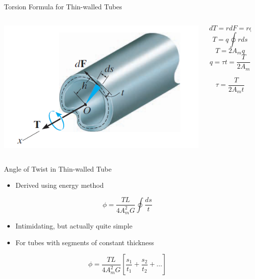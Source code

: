 \documentclass[10pt, svgnames]{beamer}
\begin{document}
\begin{frame}[label={sec:org9d59bc4}]{Torsion Formula for Thin-walled Tubes}
\begin{columns}
\begin{column}{0.6\columnwidth}
\begin{center}
\begin{center}
\includegraphics[width=.9\linewidth]{./pictures/thin-walled-torsion-formula.png}
\end{center}
\end{center}
\end{column}

\begin{column}{0.4\columnwidth}
\[dT = rdF = rqds\] \[T = q \oint rds\] \[T = 2 A_m q\]
\[q = \tau t = \frac{T}{2A_m}\]

\[\tau = \frac{T}{2A_m t}\]
\end{column}
\end{columns}
\end{frame}

\begin{frame}[label={sec:org157de5b}]{Angle of Twist in Thin-walled Tube}
\begin{itemize}
\item Derived using energy method
\end{itemize}

\[\phi = \frac{TL}{4A_m^2 G} \oint \frac{ds}{t}\]

\begin{itemize}
\item Intimidating, but actually quite simple

\item For tubes with segments of constant thickness
\end{itemize}

\[\phi = \frac{TL}{4A_m^2 G} \left[ \frac{s_1}{t_1} + \frac{s_2}{t_2} + \ldots \right]\]
\end{frame}
\end{document}
